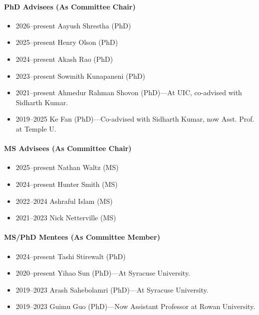 \paragraph{PhD Advisees (As Committee Chair)}
\begin{itemize}
\vspace{0.15cm}\item 2026--present Aayush Shrestha (PhD)
\item 2025--present Henry Olson (PhD)
\item 2024--present Akash Rao (PhD)
\item 2023--present Sowmith Kunapaneni (PhD)
\item 2021--present Ahmedur Rahman Shovon (PhD)---At UIC, co-advised with Sidharth Kumar.
\item 2019--2025 Ke Fan (PhD)---Co-advised with Sidharth Kumar, now Asst. Prof. at Temple U.
\end{itemize}
\paragraph{MS Advisees (As Committee Chair)}
\begin{itemize}
\vspace{0.15cm}\item 2025--present Nathan Waltz (MS)
\item 2024--present Hunter Smith (MS)
\item 2022--2024 Ashraful Islam (MS)
\item 2021--2023 Nick Netterville (MS)
\end{itemize}
\paragraph{MS/PhD Mentees (As Committee Member)}
\begin{itemize}
\vspace{0.15cm}\item 2024--present Tashi Stirewalt (PhD)
\item 2020--present Yihao Sun (PhD)---At Syracuse University.
\item 2019--2023 Arash Sahebolamri (PhD)---At Syracuse University.
\item 2019--2023 Guimu Guo (PhD)---Now Assistant Professor at Rowan University.
\end{itemize}
